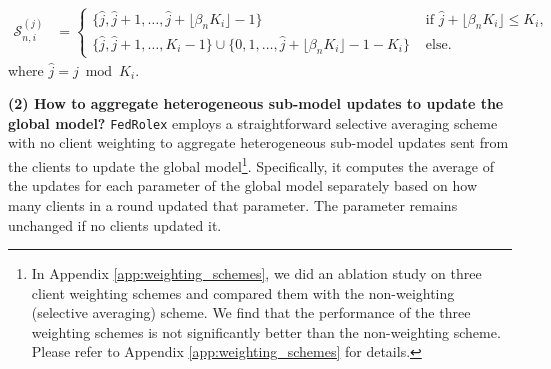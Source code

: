 \documentclass{article}
\newcommand{\rebuttal}[1]{\textcolor{black}{#1}}
\begin{document}


\vspace{-3mm}
\begin{align}
\label{eqn:subset_fedrolex}
   \mathcal{S}^{(j)}_{n,i} &= \left\{\begin{array}{ll}\{ \hat j,\hat j+1,\dots, \hat j+ \lfloor \beta_n K_i\rfloor-1\} &\mbox{ if } \hat j+\lfloor \beta_n K_i\rfloor \leq K_i,\\
    \{\hat j,\hat j+1,\dots,K_i-1\}\cup \{0,1,\dots, \hat j+\lfloor \beta_n K_i\rfloor-1-K_i\} & \mbox{ else.}
    \end{array}\right.
\end{align}
where $\hat j= j\bmod{K_i}$. 


\textbf{(2) How to aggregate heterogeneous sub-model updates to update the global model?} 
\texttt{FedRolex} employs a straightforward selective averaging scheme with no client weighting to aggregate heterogeneous sub-model updates sent from the clients to update the global model\footnote{In Appendix \ref{app:weighting_schemes}, we did an ablation study on three client weighting schemes and compared them with the non-weighting (selective averaging) scheme. We find that the performance of the three weighting schemes is not significantly better than the non-weighting scheme. Please refer to Appendix \ref{app:weighting_schemes} for details.}. Specifically, it computes the average of the updates for each parameter of the global model separately based on how many clients in a round updated that parameter. The parameter remains unchanged if no clients updated it. 
%
\end{document}
